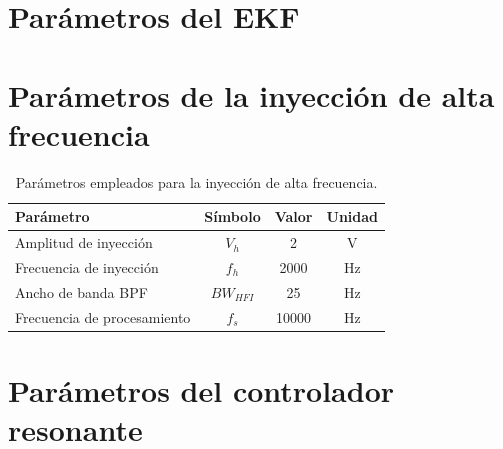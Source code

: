 \section{Parámetros del EKF}
\label{anexo:parametros_ekf}

%
%


\section{Parámetros de la inyección de alta frecuencia}
\label{anexo:parametros_hfi}

\begin{table}[htbp]
    \centering
    \caption{Parámetros empleados para la inyección de alta frecuencia.}
    \label{tab:parametros_hfi}
    \begin{tabular}{lccc}
        \hline
        \textbf{Parámetro} &
        \textbf{Símbolo} &
        \textbf{Valor} &
        \textbf{Unidad} \\
        \hline
        Amplitud de inyección & $V_h$ & 2 & V \\
        Frecuencia de inyección & $f_h$ & 2000 & Hz \\
        Ancho de banda BPF & $BW_{HFI}$ & 25 & Hz \\
        Frecuencia de procesamiento & $f_s$ & 10000 & Hz \\
        \hline
    \end{tabular}
\end{table}


\section{Parámetros del controlador resonante}
\label{anexo:parametros_pr}

%
